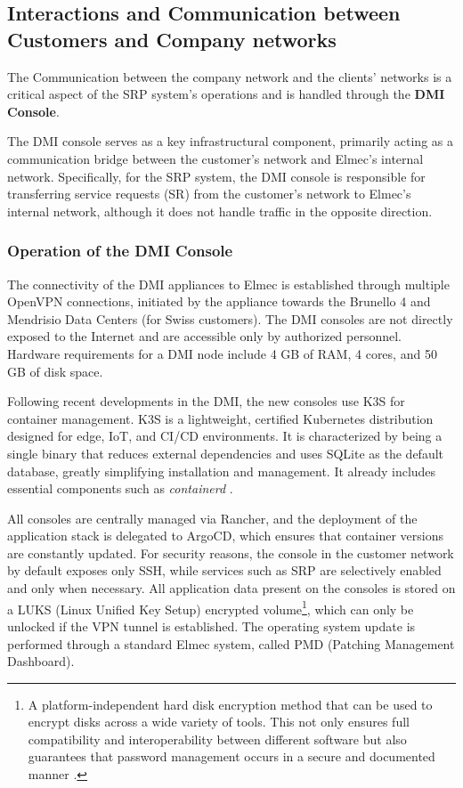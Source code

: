 \subsection{Interactions and Communication between Customers and Company networks}
The Communication between the company network and the clients' networks is a critical aspect of the SRP system's operations and is handled through the \textbf{DMI Console}.

The DMI console serves as a key infrastructural component, primarily acting as a communication bridge between the customer's network and Elmec's internal network. Specifically, for the SRP system, the DMI console is responsible for transferring service requests (SR) from the customer's network to Elmec's internal network, although it does not handle traffic in the opposite direction.

\subsubsection{Operation of the DMI Console}
The connectivity of the DMI appliances to Elmec is established through multiple OpenVPN connections, initiated by the appliance towards the Brunello 4 and Mendrisio Data Centers (for Swiss customers). The DMI consoles are not directly exposed to the Internet and are accessible only by authorized personnel. Hardware requirements for a DMI node include 4 GB of RAM, 4 cores, and 50 GB of disk space.

Following recent developments in the DMI, the new consoles use K3S for container management. K3S is a lightweight, certified Kubernetes distribution designed for edge, IoT, and CI/CD environments. It is characterized by being a single binary that reduces external dependencies and uses SQLite as the default database, greatly simplifying installation and management. It already includes essential components such as \textit{containerd} \cite{k3s}.

All consoles are centrally managed via Rancher, and the deployment of the application stack is delegated to ArgoCD, which ensures that container versions are constantly updated. For security reasons, the console in the customer network by default exposes only SSH, while services such as SRP are selectively enabled and only when necessary. All application data present on the consoles is stored on a LUKS (Linux Unified Key Setup) encrypted volume\footnote{A platform-independent hard disk encryption method that can be used to encrypt disks across a wide variety of tools. This not only ensures full compatibility and interoperability between different software but also guarantees that password management occurs in a secure and documented manner \cite{luks}.}, which can only be unlocked if the VPN tunnel is established. The operating system update is performed through a standard Elmec system, called PMD (Patching Management Dashboard).

